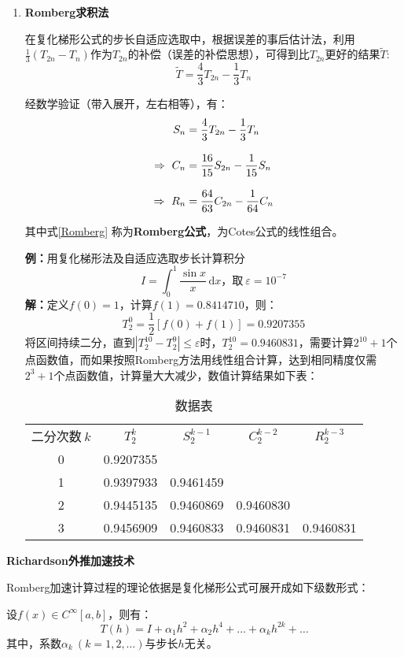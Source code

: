 \begin{enumerate}
\item \textbf{Romberg求积法}

在复化梯形公式的步长自适应选取中，根据误差的事后估计法，利用$\displaystyle{\frac{1}{3}(T_{2n}-T_n)}$作为$T_{2n}$的补偿（误差的补偿思想），可得到比$T_{2n}$更好的结果$\tilde{T}$:
$$
\tilde{T} = \frac{4}{3}T_{2n}-\frac{1}{3}T_n
$$

经数学验证（带入展开，左右相等），有：
\begin{align}
S_n &= \frac{4}{3}T_{2n}-\frac{1}{3}T_n \notag \\[3mm]
\Rightarrow\ C_n &= \frac{16}{15}S_{2n}-\frac{1}{15}S_n \notag \\[3mm]
\Rightarrow\ R_n &= \frac{64}{63}C_{2n}-\frac{1}{64}C_n \label{Romberg}
\end{align}

其中式\ref{Romberg} 称为\textbf{Romberg公式}，为Cotes公式的线性组合。

\textbf{例：}用复化梯形法及自适应选取步长计算积分
$$
I=\int_0^1 \frac{\sin x}{x}\,\mathrm{d}x\text{，取}\ \varepsilon = 10^{-7}
$$
\textbf{解：}定义$f(0)=1$，计算$f(1)=0.8414710$，则：
$$
T_2^0 = \frac{1}{2}[f(0)+f(1)] = 0.9207355
$$
将区间持续二分，直到$\left|T_2^{10}-T_2^9 \right|\leqslant \varepsilon$时，$T_2^{10}=0.9460831$，需要计算$2^{10}+1$个点函数值，而如果按照Romberg方法用线性组合计算，达到相同精度仅需$2^3+1$个点函数值，计算量大大减少，数值计算结果如下表：
\begin{table}[h]
\renewcommand\arraystretch{1.8}
\centering
\caption{数据表}
\begin{tabular}{ccccc}
\small{二分次数}$\ k$ & \small{$T_2^{k}$} & \small{$S_2^{k-1}$} & \small{$C_2^{k-2}$} & \small{$R_2^{k-3}$} \\
0 & 0.9207355 & \  & \  & \ \\
1 & 0.9397933 & 0.9461459  & \  & \ \\
2 & 0.9445135 & 0.9460869  & 0.9460830  & \ \\
3 & 0.9456909 & 0.9460833  & 0.9460831  & 0.9460831 \\
\end{tabular}
\end{table}
\end{enumerate}
\newpage

\textbf{Richardson外推加速技术}

Romberg加速计算过程的理论依据是复化梯形公式可展开成如下级数形式：
\begin{thm3}
设$f(x)\in C^\infty [a,b]$，则有：
\begin{equation}\label{th}
T(h) = I + \alpha_1 h^2 + \alpha_2 h^4 + \dots +\alpha_k h^{2k} + \dots
\end{equation}
其中，系数$\alpha_k\ (k=1,2,\dots)$与步长$h$无关。
\end{thm3}

